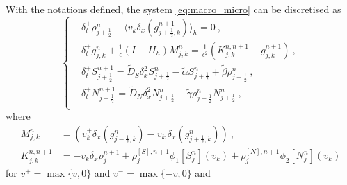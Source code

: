 \documentclass[11pt,twoside]{article}
\theoremstyle{nonumberplain}
\begin{document}
  With the notations defined, the system \eqref{eq:macro_micro} can be discretised as
   \begin{equation}
\begin{cases}\label{eq: main scheme}
   &\delta_t^+\rho_{j+\frac{1}{2}}^n +\langle v_k \delta_x (g_{j+\frac12,k}^{n+1})\rangle_h=0\ ,\\
   
        &\delta_t^+ g_{j,k}^n + \frac{1}{\epsilon}(I-II_h)M_{j,k}^n =\frac{1}{\epsilon^2}(K_{j,k}^{n,n+1}-g_{j,k}^{n+1})\ ,\\
        
        &\delta_t^+S_{j+\frac{1}{2}}^{n+1} = \tilde{D}_S \delta _x^2S_{j+\frac{1}{2}}^{n}-\tilde{\alpha} S_{j+\frac{1}{2}}^{n}+\tilde{\beta}\rho_{j+\frac{1}{2}}^{n}\ ,\\
        
     &\delta_t^+N_{j+\frac{1}{2}}^{n+1} = \tilde{D}_N \delta _x^2N_{j+\frac{1}{2}}^{n}-\tilde{\gamma} \rho_{j+\frac{1}{2}}^{n}N_{j+\frac{1}{2}}^{n}\ ,\\
   \end{cases}
   \end{equation}
where
\begin{align}
M_{j,k}^n&=(v_k^+\delta_x(g_{j-\frac{1}{2},k}^n)-v_k^-\delta_x(g_{j+\frac{1}{2},k}^n))\ ,\\
K_{j,k}^{n,n+1}
& = -v_k\delta_x\rho_{j}^{n+1}+\rho^{[S],n+1}_{j}\phi_1[S_{j}^n](v_k)+\rho^{[N],n+1}_{j}\phi_2[N_{j}^n](v_k)
\end{align}
for $v^+=\max\{v,0\}$ and $v^-=\max\{-v,0\}$ and 
\end{document}
